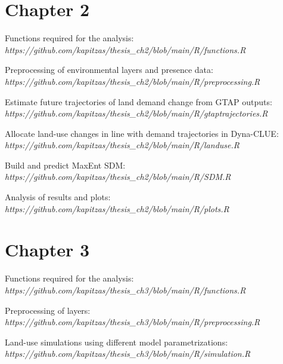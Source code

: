 \documentclass[titlesmallcaps,copyrightpage]{uomthesis}\usepackage[]{graphicx}\usepackage[]{color}
\begin{document}
\section{Chapter 2}

\noindent Functions required for the analysis: \\
\textit{https://github.com/kapitzas/thesis\_ch2/blob/main/R/functions.R}
\vspace{0.3cm}

\noindent Preprocessing of environmental layers and presence data: \\
\textit{https://github.com/kapitzas/thesis\_ch2/blob/main/R/preprocessing.R}
\vspace{0.3cm}

\noindent Estimate future trajectories of land demand change from GTAP outputs: \\
\textit{https://github.com/kapitzas/thesis\_ch2/blob/main/R/gtaptrajectories.R}
\vspace{0.3cm}

\noindent Allocate land-use changes in line with demand trajectories in Dyna-CLUE: \\
\textit{https://github.com/kapitzas/thesis\_ch2/blob/main/R/landuse.R}
\vspace{0.3cm}

\noindent Build and predict MaxEnt SDM: \\
\textit{https://github.com/kapitzas/thesis\_ch2/blob/main/R/SDM.R}
\vspace{0.3cm}

\noindent Analysis of results and plots: \\
\textit{https://github.com/kapitzas/thesis\_ch2/blob/main/R/plots.R}
\vspace{0.3cm}

\section{Chapter 3}

\noindent Functions required for the analysis: \\
\textit{https://github.com/kapitzas/thesis\_ch3/blob/main/R/functions.R}
\vspace{0.3cm}

\noindent Preprocessing of layers: \\
\textit{https://github.com/kapitzas/thesis\_ch3/blob/main/R/preprocessing.R}
\vspace{0.3cm}

\noindent Land-use simulations using different model parametrizations: \\
\textit{https://github.com/kapitzas/thesis\_ch3/blob/main/R/simulation.R}
\vspace{0.3cm}
\end{document}
